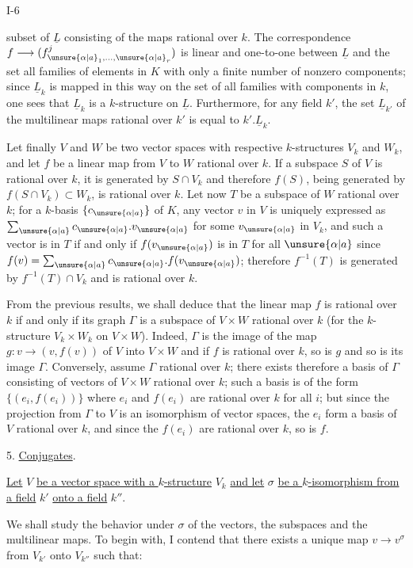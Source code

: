 I-6

subset of $\underline L$ consisting of the maps rational over $k$. The correspondence $f\longrightarrow(f^j_{\unsure{\alpha|a}_1,\ldots,\unsure{\alpha|a}_r})$ is linear and one-to-one between $\underline L$ and the set all families of elements in $K$ with only a finite number of nonzero components; since $\underline L_k$ is mapped in this way on the set of all families with components in $k$, one sees that $\underline L_k$ is a $k$-structure on $\underline L$. Furthermore, for any field $k'$, the set $\underline L_{k'}$ of the multilinear maps rational over $k'$ is equal to $k'.\underline L_k$.

Let finally $V$ and $W$ be two vector spaces with respective $k$-structures $V_k$ and $W_k$, and let $f$ be a linear map from $V$ to $W$ rational over $k$. If a subspace $S$ of $V$ is rational over $k$, it is generated by $S\cap V_k$ and therefore $f(S)$, being generated by $f(S\cap V_k)\subset W_k$, is rational over $k$. Let now $T$ be a subspace of $W$ rational over $k$; for a $k$-basis $\{c_{\unsure{\alpha|a}}\}$ of $K$, any vector $v$ in $V$ is uniquely expressed as $\sum_{\unsure{\alpha|a}} c_{\unsure{\alpha|a}}.v_{\unsure{\alpha|a}}$ for some $v_{\unsure{\alpha|a}}$ in $V_k$, and such a vector is in $T$ if and only if $f(v_{\unsure{\alpha|a}})$ is in $T$ for all $\unsure{\alpha|a}$ since $f(v)=\sum_{\unsure{\alpha|a}}c_{\unsure{\alpha|a}}.f(v_{\unsure{\alpha|a}})$; therefore $f^{-1}(T)$ is generated by $f^{-1}(T)\cap V_k$ and is rational over $k$.

From the previous results, we shall deduce that the linear map $f$ is rational over $k$ if and only if its graph $\Gamma$ is a subspace of $V\times W$ rational over $k$ (for the $k$-structure $V_k\times W_k$ on $V\times W$). Indeed, $\Gamma$ is the image of the map $g:v\longrightarrow(v,f(v))$ of $V$ into $V\times W$ and if $f$ is rational over $k$, so is $g$ and so is its image $\Gamma$. Conversely, assume $\Gamma$ rational over $k$; there exists therefore a basis of $\Gamma$ consisting of vectors of $V\times W$ rational over $k$; such a basis is of the form $\{(e_i,f(e_i))\}$ where $e_i$ and $f(e_i)$ are rational over $k$ for all $i$; but since the projection from $\Gamma$ to $V$ is an isomorphism of vector spaces, the $e_i$ form a basis of $V$ rational over $k$, and since the $f(e_i)$ are rational over $k$, so is $f$.

5. \uline{Conjugates}.

\uline{Let} $V$ \uline{be a vector space with a $k$-structure} $V_k$ \uline{and let} $\sigma$ \uline{be a $k$-isomorphism from a field} $k'$ \uline{onto a field} $k''$.

We shall study the behavior under $\sigma$ of the vectors, the subspaces and the multilinear maps. To begin with, I contend that there exists a unique map $v\longrightarrow v^\sigma$ from $V_{k'}$ onto $V_{k''}$ such that:
